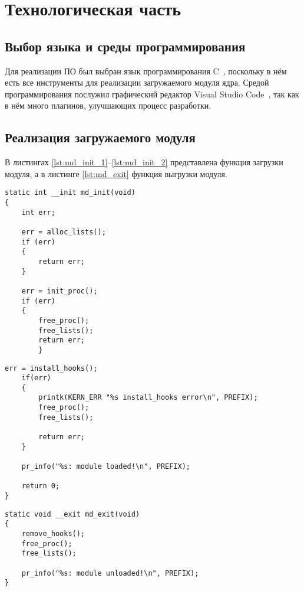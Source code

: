 \chapter{Технологическая часть}

\section{Выбор языка и среды программирования}

Для реализации ПО был выбран язык программирования C~\cite{c}, поскольку в нём есть все инструменты для реализации загружаемого модуля ядра. Средой программирования послужил графический редактор Visual Studio Code~\cite{vscode}, так как в нём много плагинов, улучшающих процесс разработки.


\section{Реализация загружаемого модуля}

В листингах \ref{lst:md_init_1}--\ref{lst:md_init_2} представлена функция загрузки модуля, а в листинге \ref{lst:md_exit} функция выгрузки модуля.

\begin{lstlisting}[label=lst:md_init_1,caption=Функция загрузки модуля]
static int __init md_init(void)
{
	int err;
	
	err = alloc_lists();
	if (err)
	{
		return err;
	}
	
	err = init_proc();
	if (err)
	{
		free_proc();
		free_lists();
		return err;
		}
\end{lstlisting}
\begin{lstlisting}[label=lst:md_init_2,caption=Функция загрузки модуля]
	err = install_hooks();
	if(err)
	{
		printk(KERN_ERR "%s install_hooks error\n", PREFIX);
		free_proc();
		free_lists();
		
		return err;
	}
	
	pr_info("%s: module loaded!\n", PREFIX);
	
	return 0;
}

\end{lstlisting}


\begin{lstlisting}[label=lst:md_exit,caption=Функция выгрузки модуля]
static void __exit md_exit(void)
{
	remove_hooks();
	free_proc();
	free_lists();
	
	pr_info("%s: module unloaded!\n", PREFIX);
}
\end{lstlisting}

